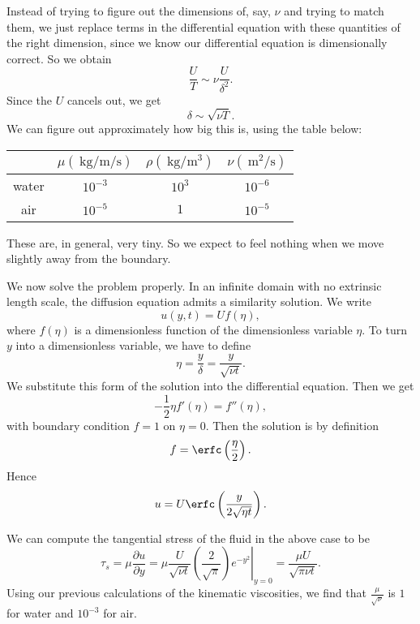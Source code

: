 \documentclass[a4paper]{article}
\begin{document}
\begin{eg}
  Instead of trying to figure out the dimensions of, say, $\nu$ and trying to match them, we just replace terms in the differential equation with these quantities of the right dimension, since we know our differential equation is dimensionally correct. So we obtain
  \[
    \frac{U}{T} \sim \nu \frac{U}{\delta^2}.
  \]
  Since the $U$ cancels out, we get
  \[
    \delta \sim \sqrt{\nu T}.
  \]
  We can figure out approximately how big this is, using the table below:
  \begin{center}
    \begin{tabular}{cccc}
      \toprule
      & $\mu(\SI{}{\kilo\gram\per\meter\per\second})$ & $\rho(\SI{}{\kilo\gram\per\meter\cubed})$ & $\nu(\SI{}{\meter\squared\per\second})$\\
      \midrule
      water & $10^{-3}$ & $10^3$ & $10^{-6}$\\
      air & $10^{-5}$ & $1$ & $10^{-5}$\\
      \bottomrule
    \end{tabular}
  \end{center}
  These are, in general, very tiny. So we expect to feel nothing when we move slightly away from the boundary.

  We now solve the problem properly. In an infinite domain with no extrinsic length scale, the diffusion equation admits a similarity solution. We write
  \[
    u(y, t) = U f(\eta),
  \]
  where $f(\eta)$ is a dimensionless function of the dimensionless variable $\eta$. To turn $y$ into a dimensionless variable, we have to define
  \[
    \eta = \frac{y}{\delta} = \frac{y}{\sqrt{\nu t}}.
  \]
  We substitute this form of the solution into the differential equation. Then we get
  \[
    -\frac{1}{2} \eta f'(\eta) = f''(\eta),
  \]
  with boundary condition $f = 1$ on $\eta = 0$. Then the solution is by definition
  \[
    f = \erfc \left(\frac{\eta}{2}\right).
  \]
  Hence
  \[
    u = U \erfc \left(\frac{y}{2\sqrt{\eta t}}\right).
  \]
  \begin{center}
  \end{center}
  We can compute the tangential stress of the fluid in the above case to be
  \[
    \tau_s = \mu\frac{\partial u}{\partial y} = \left.\mu \frac{U}{\sqrt{\nu t}} \left(\frac{2}{\sqrt{\pi}}\right) e^{-y^{2}}\right|_{y = 0} = \frac{\mu U}{\sqrt{\pi \nu t}}.
  \]
  Using our previous calculations of the kinematic viscosities, we find that $\frac{\mu}{\sqrt{\nu}}$ is $1$ for water and $10^{-3}$ for air.


\end{eg}
\end{document}
